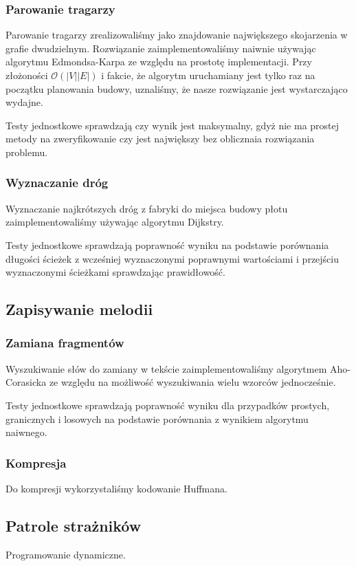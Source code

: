 \documentclass{article}
\begin{document}
\subsubsection{Parowanie tragarzy}
Parowanie tragarzy zrealizowaliśmy jako znajdowanie największego skojarzenia w grafie dwudzielnym.
Rozwiązanie zaimplementowaliśmy naiwnie używając algorytmu Edmondsa-Karpa ze względu na prostotę implementacji.
Przy złożoności \(\mathcal{O}(|V||E|)\)\cite{cs6820matchingnotes}
i fakcie, że algorytm uruchamiany jest tylko raz na początku planowania budowy,
uznaliśmy, że nasze rozwiązanie jest wystarczająco wydajne.

\noindent Testy jednostkowe sprawdzają czy wynik jest maksymalny,
gdyż nie ma prostej metody na zweryfikowanie czy jest największy
bez oblicznaia rozwiązania problemu.
\subsubsection{Wyznaczanie dróg}
Wyznaczanie najkrótszych dróg z fabryki do miejsca budowy płotu zaimplementowaliśmy używając algorytmu Dijkstry.

\noindent Testy jednostkowe sprawdzają poprawność wyniku
na podstawie porównania długości ścieżek z wcześniej wyznaczonymi poprawnymi wartościami
i przejściu wyznaczonymi ścieżkami sprawdzając prawidłowość.

\subsection{Zapisywanie melodii}
\subsubsection{Zamiana fragmentów}
Wyszukiwanie słów do zamiany w tekście zaimplementowaliśmy algorytmem Aho-Corasicka
ze względu na możliwość wyszukiwania wielu wzorców jednocześnie.

\noindent Testy jednostkowe sprawdzają poprawność wyniku
dla przypadków prostych, granicznych i losowych na podstawie porównania
z wynikiem algorytmu naiwnego.
\subsubsection{Kompresja}
Do kompresji wykorzystaliśmy kodowanie Huffmana.

\subsection{Patrole strażników}
Programowanie dynamiczne.

\printbibliography[heading=bibintoc]
\end{document}
